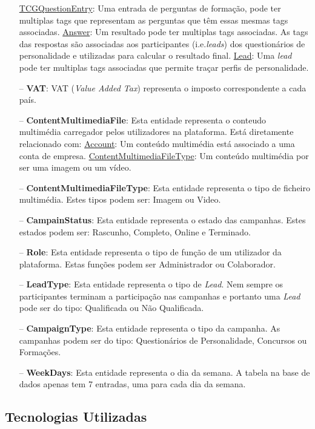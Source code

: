 \begin{itemize}
		\subitem \underline{TCGQuestionEntry}: Uma entrada de perguntas de formação, pode ter multiplas tags que representam as perguntas que têm essas mesmas tags associadas.
		\subitem \underline{Answer}: Um resultado pode ter multiplas tags associadas. As tags das respostas são associadas aos participantes (i.e.\textit{leads}) dos questionários de personalidade e utilizadas para calcular o resultado final.
		\subitem \underline{Lead}: Uma \textit{lead} pode ter multiplas tags associadas que permite traçar perfis de personalidade.
	\item[--] \textbf{VAT}: VAT (\textit{Value Added Tax}) representa o imposto correspondente a cada país.
	\item[--] \textbf{ContentMultimediaFile}: Esta entidade representa o conteudo multimédia carregador pelos utilizadores na plataforma. Está diretamente relacionado com:
		\subitem \underline{Account}: Um conteúdo multimédia está associado a uma conta de empresa.
		\subitem \underline{ContentMultimediaFileType}: Um conteúdo multimédia por ser uma imagem ou um vídeo.
	\item[--] \textbf{ContentMultimediaFileType}: Esta entidade representa o tipo de ficheiro multimédia. Estes tipos podem ser:  Imagem ou Video.
	\item[--] \textbf{CampainStatus}: Esta entidade representa o estado das campanhas. Estes estados podem ser: Rascunho, Completo, Online e Terminado.
	\item[--] \textbf{Role}: Esta entidade representa o tipo de função de um utilizador da plataforma. Estas funções podem ser Administrador ou Colaborador.
	\item[--] \textbf{LeadType}: Esta entidade representa o tipo de \textit{Lead}. Nem sempre os participantes terminam a participação nas campanhas e portanto uma \textit{Lead} pode ser do tipo: Qualificada ou Não Qualificada.
	\item[--] \textbf{CampaignType}: Esta entidade representa o tipo da campanha. As campanhas podem ser do tipo: Questionários de Personalidade, Concursos ou Formações. 
	\item[--] \textbf{WeekDays}: Esta entidade representa o dia da semana. A tabela na base de dados apenas tem 7 entradas, uma para cada dia da semana.
\end{itemize}


\subsection{Tecnologias Utilizadas}

